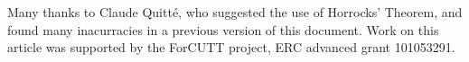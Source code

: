 Many thanks to Claude Quitt\'e, who suggested the use of Horrocks' Theorem, and found many
inacurracies in a previous version of this document.
Work on this article was supported by the ForCUTT project, ERC advanced grant 101053291.
